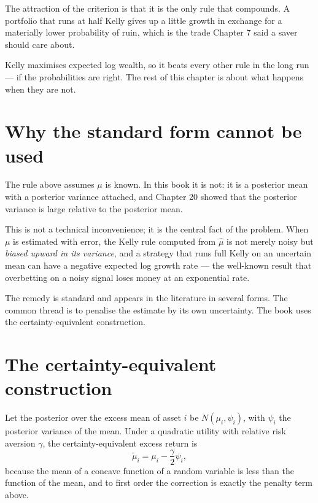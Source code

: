 The attraction of the criterion is that it is the only rule that
compounds. A portfolio that runs at half Kelly gives up a little growth in
exchange for a materially lower probability of ruin, which is the trade
Chapter 7 said a saver should care about.

\begin{takeaway}
Kelly maximises expected log wealth, so it beats every other rule in the
long run --- if the probabilities are right. The rest of this chapter is
about what happens when they are not.
\end{takeaway}

\section{Why the standard form cannot be used}

The rule above assumes \(\mu\) is known. In this book it is not: it is a
posterior mean with a posterior variance attached, and Chapter 20 showed
that the posterior variance is large relative to the posterior mean.

This is not a technical inconvenience; it is the central fact of the
problem. When \(\mu\) is estimated with error, the Kelly rule computed
from \(\hat{\mu}\) is not merely noisy but \emph{biased upward in its
variance}, and a strategy that runs full Kelly on an uncertain mean can
have a negative expected log growth rate --- the well-known result that
overbetting on a noisy signal loses money at an exponential rate.

The remedy is standard and appears in the literature in several forms. The
common thread is to penalise the estimate by its own uncertainty. The
book uses the certainty-equivalent construction.

\section{The certainty-equivalent construction}

Let the posterior over the excess mean of asset \(i\) be
\(N(\mu_i, \psi_i)\), with \(\psi_i\) the posterior variance of the mean.
Under a quadratic utility with relative risk aversion \(\gamma\), the
certainty-equivalent excess return is
\begin{equation}
\tilde{\mu}_i = \mu_i - \frac{\gamma}{2}\psi_i,
\end{equation}
because the mean of a concave function of a random variable is less than
the function of the mean, and to first order the correction is exactly the
penalty term above.

